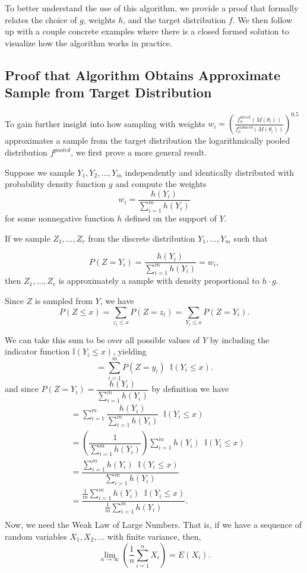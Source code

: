 \documentclass[12pt,twoside]{smiththesis}
\begin{document}
To better understand the use of this algorithm, we provide a proof that formally relates the choice of \(g\), weights \(h\), and the target distribution \(f\). We then follow up with a couple concrete examples where there is a closed formed solution to visualize how the algorithm works in practice.

\hypertarget{proof}{%
\subsection{Proof that Algorithm Obtains Approximate Sample from Target Distribution}\label{proof}}

To gain further insight into how sampling with weights
\(w_i = \left( \frac{f_\phi^{direct}(M(\theta_i))}{f_\phi^{induced}(M(\theta_i))} \right)^{0.5}\)
approximates a sample from the target distribution the logarithmically pooled distribution \(f^{pooled}\), we first prove a more general result.
\begin{tcolorbox}[title=Function $M$ Relating Testing Positivity Parameters to Asymptomatic Rate]
Suppose we sample $Y_1, Y_2, \dots, Y_m$ independently and identically distributed with probability density function  $g$ and compute the weights
\[ w_i =\dfrac{h(Y_i)}{\sum_{i=1}^mh(Y_i) }\]
for some nonnegative function $h$ defined on the support of $Y$.

If  we sample $Z_1, \dots, Z_r$ from the discrete distribution $Y_1,\dots, Y_m$ such that 

\[ P(Z = Y_i) = \dfrac{h(Y_i)}{\sum_{i=1}^mh(Y_i) } = w_i ,\]
then $Z_1, \dots, Z_r$ is approximately a sample with density proportional to $h \cdot g$.

\end{tcolorbox}
\vspace{5 mm}

Since \(Z\) is sampled from \(Y\), we have
\[ P(Z \leq x ) = \sum_{z_i \leq x} P(Z=z_i) = \sum_{Y_i \leq x} P(Z=Y_i) .\]

We can take this sum to be over all possible values of \(Y\) by including the indicator function \(\mathbb{I} (Y_i \leq x)\), yielding
\[  = \sum_{i = 1}^m P(Z=y_i)\;\;\mathbb{I} (Y_i \leq x).  \]
and since \(P(Z=Y_i) = \dfrac{h(Y_i)}{\sum_{i=1}^mh(Y_i) }\) by definition we have
\begin{align*} 
&= \sum_{i = 1}^m \dfrac{h(Y_i)}{\sum_{i=1}^mh(Y_i) }  \;\;\mathbb{I} (Y_i \leq x)   \\
&=  \left( \dfrac{1}{ {\sum_{i=1}^mh(Y_i) }} \right) {\sum_{i=1}^mh(Y_i) }  \;\;\mathbb{I} (Y_i \leq x)   \\
&=   \dfrac{ {\sum_{i=1}^mh(Y_i) }  \;\;\mathbb{I} (Y_i \leq x) }{\sum_{i=1}^mh(Y_i) } \\
&=   \dfrac{ \frac 1m {\sum_{i=1}^mh(Y_i) }  \;\;\mathbb{I} (Y_i \leq x) }{\frac 1m \sum_{i=1}^mh(Y_i) }. \\
\end{align*}
Now, we need the Weak Law of Large Numbers. That is, if we have a sequence of random variables \(X_1, X_2, \dots\) with finite variance, then,
\[ \lim_{n \to \infty} \left( \frac{1}{n} \sum_{i=1}^n X_i \right)  = E(X_i). \]
\end{document}
